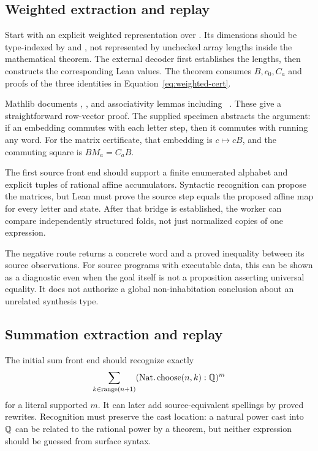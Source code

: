 \subsection{Weighted extraction and replay}

Start with an explicit weighted representation over . Its dimensions
should be type-indexed by  and , not represented by
unchecked array lengths inside the mathematical theorem. The external decoder
first establishes the lengths, then constructs the corresponding Lean values.
The theorem consumes $B,c_0,C_a$ and proofs of the three identities in
Equation~\eqref{eq:weighted-cert}.

Mathlib documents , , and associativity
lemmas including ~\cite{mathlib-matrix}. These give a
straightforward row-vector proof. The supplied  specimen
abstracts the argument: if an embedding commutes with each letter step, then it
commutes with running any word. For the matrix certificate, that embedding is
$c\mapsto cB$, and the commuting square is $BM_a=C_aB$.

The first source front end should support a finite enumerated alphabet and
explicit tuples of rational affine accumulators. Syntactic recognition can
propose the matrices, but Lean must prove the source step equals the proposed
affine map for every letter and state. After that bridge is established, the
worker can compare independently structured folds, not just normalized copies
of one expression.

The negative route returns a concrete word and a proved inequality between its
source observations. For source programs with executable data, this can be
shown as a diagnostic even when the goal itself is not a proposition asserting
universal equality. It does not authorize a global non-inhabitation conclusion
about an unrelated synthesis type.

\subsection{Summation extraction and replay}

The initial sum front end should recognize exactly
\[
 \sum_{k\in\operatorname{range}(n+1)} (\operatorname{Nat.choose}(n,k):\mathbb{Q})^m
\]
for a literal supported $m$. It can later add source-equivalent spellings by
proved rewrites. Recognition must preserve the cast location: a natural power
cast into $\mathbb{Q}$ can be related to the rational power by a theorem, but neither
expression should be guessed from surface syntax.

